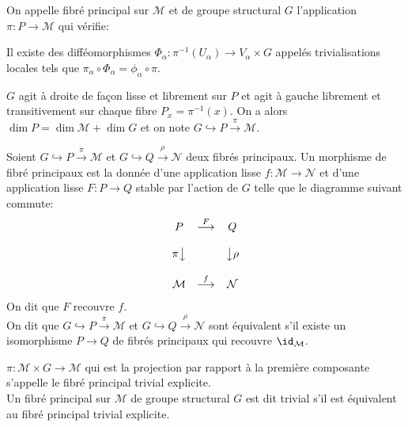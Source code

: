 \begin{defi}
On appelle fibré principal sur $\mathcal{M}$ et de groupe structural $G$ l'application $\pi: P \to \mathcal{M}$ qui vérifie:
\be 
	\item Il existe des difféomorphismes $\Phi_\alpha : \pi^{-1}(U_\alpha) \to V_\alpha \times G$ appelés trivialisations locales tels que $\pi_\alpha \circ \Phi_\alpha = \phi_\alpha \circ \pi$. 
	\item $G$ agit à droite de façon lisse et librement sur $P$ et agit à gauche librement et transitivement sur chaque fibre $P_x = \pi^{-1}(x)$.
\ee
On a alors $\dim P = \dim \mathcal{M} + \dim G$ et on note $G \hookrightarrow P \overset{\pi}{\to} \mathcal{M}$.
\end{defi}

\begin{defi}
Soient $G \hookrightarrow P \overset{\pi}{\to} \mathcal{M}$ et $G \hookrightarrow Q \overset{\rho}{\to} \mathcal{N}$ deux fibrés principaux. Un morphisme de fibré principaux est la donnée d'une application lisse $f:\mathcal{M}\to \mathcal{N}$ et d'une application lisse $F: P \to Q$ stable par l'action de $G$ telle que le diagramme suivant commute:
$$\begin{matrix}
P  & \overset{F}{\longrightarrow} & Q \\ \\
\pi\big\downarrow &  & \big\downarrow\rho \\ \\
\mathcal{M} & \overset{f}{\longrightarrow} & \mathcal{N} 
\end{matrix}
$$
On dit que $F$ recouvre $f$. \\

On dit que $G \hookrightarrow P \overset{\pi}{\to} \mathcal{M}$ et $G \hookrightarrow Q \overset{\rho}{\to} \mathcal{N}$ sont équivalent s'il existe un isomorphisme $P\to Q$ de fibrés principaux qui recouvre $\id_\mathcal{M}$.
\end{defi}

\begin{defi}
$\pi : \mathcal{M}\times G \to \mathcal{M}$ qui est la projection par rapport à la première composante s'appelle le fibré principal trivial explicite. \\
Un fibré principal sur $\mathcal{M}$ de groupe structural $G$ est dit trivial s'il est équivalent au fibré principal trivial explicite. 
\end{defi}

